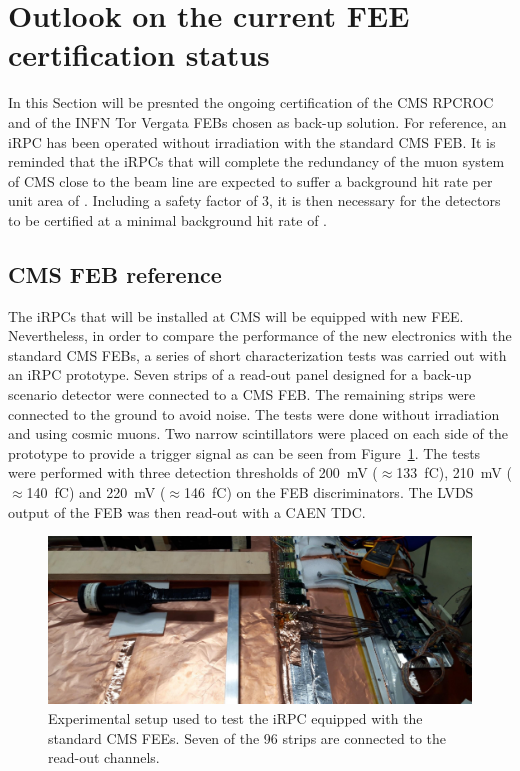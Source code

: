 	\section{Outlook on the current FEE certification status}
	\label{chapt6:sec:outlooks}
	
	In this Section will be presnted the ongoing certification of the CMS RPCROC and of the INFN Tor Vergata FEBs chosen as back-up solution. For reference, an iRPC has been operated without irradiation with the standard CMS FEB. It is reminded that the iRPCs that will complete the redundancy of the muon system of CMS close to the beam line are expected to suffer a background hit rate per unit area of . Including a safety factor of 3, it is then necessary for the detectors to be certified at a minimal background hit rate of .
	
		\subsection{CMS \acl{FEB} reference}
		\label{chapt6:ssec:CMSFEBref}
    
    The iRPCs that will be installed at CMS will be equipped with new \acl{FEE}. Nevertheless, in order to compare the performance of the new electronics with the standard CMS FEBs, a series of short characterization tests was carried out with an iRPC prototype. Seven strips of a read-out panel designed for a back-up scenario detector were connected to a CMS FEB. The remaining strips were connected to the ground to avoid noise. The tests were done without irradiation and using cosmic muons. Two narrow scintillators were placed on each side of the prototype to provide a trigger signal as can be seen from Figure~\ref{fig:iRPC_CMS_Setup}. The tests were performed with three detection thresholds of \SI{200}{mV} ($\approx$\SI{133}{fC}), \SI{210}{mV} ($\approx$\SI{140}{fC}) and \SI{220}{mV} ($\approx$\SI{146}{fC}) on the FEB discriminators. The LVDS output of the FEB was then read-out with a CAEN TDC.
		
	\begin{figure}[H]
		\centering
		\includegraphics[width = 0.9\linewidth]{fig/chapt6/iRPC-CMS_FEB-Setup.png}
		\caption{\label{fig:iRPC_CMS_Setup} Experimental setup used to test the iRPC equipped with the standard CMS FEEs. Seven of the 96 strips are connected to the read-out channels.}
    \end{figure}

